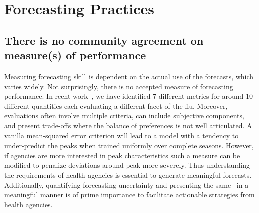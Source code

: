 \documentclass[10pt,letterpaper]{article}
\begin{document}
\section*{Forecasting Practices}

\subsection*{There is no community agreement on measure(s) of performance}
Measuring forecasting skill is dependent on the actual use of the forecasts,
which varies widely. Not surprisingly, there is no accepted measure of
forecasting performance. In reent work~\cite{tabataba2015smq}, we have
identified 7 different metrics for around 10 different quantities each
evaluating a different facet of the flu.
Moreover, evaluations often involve multiple criteria, can include subjective
components, and present trade-offs where the balance of preferences is not well
articulated. A vanilla mean-squared error criterion will lead to a model with a
tendency to under-predict the peaks when trained uniformly over complete
seasons. However, if agencies are more interested in peak characteristics such
a measure can be modified to penalize deviations around peak more severely.
Thus understanding the requirements of health agencies is essential to generate
meaningful forecasts. Additionally, quantifying forecasting uncertainty and
presenting the same~\cite{tabataba2015smq} in a meaningful manner is of prime importance to
facilitate actionable strategies from health agencies.

\end{document}
